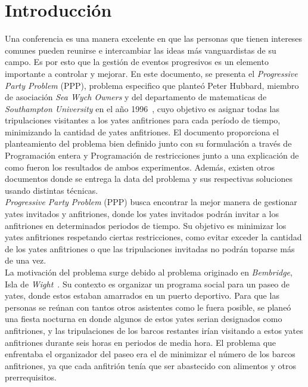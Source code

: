 \documentclass[letter, 10pt]{article}
\begin{document}
\section{Introducción}
Una conferencia es una manera excelente en que las personas que tienen intereses comunes pueden reunirse e intercambiar las ideas m\'as vanguardistas de su campo. Es por esto que la gestión de eventos progresivos es un elemento importante a controlar y mejorar. En este documento, se presenta el \textit{Progressive Party Problem} (PPP), problema especifico que plante\'o Peter Hubbard, miembro de asociación \textit{Sea Wych Owners} y del departamento de matematicas de \textit{Southampton University} en el a\~no 1996~\cite{Kalvelagen20031713}, cuyo objetivo es asignar todas las tripulaciones visitantes a los yates anfitriones para cada período de tiempo, minimizando la cantidad de yates anfitriones. El documento proporciona el planteamiento del problema bien definido junto con su formulación a través de Programación entera y Programación de restricciones junto a una explicación de como fueron los resultados de ambos experimentos. Además, existen otros documentos donde se entrega la data del problema y sus respectivas soluciones usando distintas técnicas.
\\

\textit{Progressive Party Problem} (PPP) busca encontrar la mejor manera de gestionar yates invitados y anfitriones, donde los yates invitados podrán invitar a los anfitriones en determinados periodos de tiempo. Su objetivo es minimizar los yates anfitriones respetando ciertas restricciones, como evitar exceder la cantidad de los yates anfitriones o que las tripulaciones invitadas no podrán toparse más de una vez.
\\

La motivación del problema surge debido al problema originado en \textit{Bembridge}, Isla de \textit{Wight}~\cite{Kalvelagen20031713}. Su contexto es organizar un programa social para un paseo de yates, donde estos estaban amarrados en un puerto deportivo. Para que las personas se reúnan con tantos otros asistentes como le fuera posible, se planeó una fiesta nocturna en donde algunos de estos yates serian designados como anfitriones, y las tripulaciones de los barcos restantes ir\'ian visitando a estos yates anfitriones durante seis horas en periodos de media hora. El problema que enfrentaba el organizador del paseo era el de minimizar el número de los barcos anfitriones, ya que cada anfitrión tenía que ser abastecido con alimentos y otros prerrequisitos. 
\\
\end{document}
